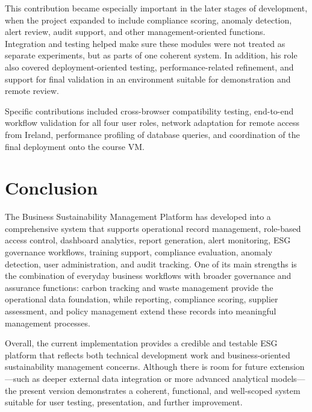 \documentclass[11pt,a4paper]{article}
\begin{document}
This contribution became especially important in the later stages of development, when the project expanded to include compliance scoring, anomaly detection, alert review, audit support, and other management-oriented functions. Integration and testing helped make sure these modules were not treated as separate experiments, but as parts of one coherent system. In addition, his role also covered deployment-oriented testing, performance-related refinement, and support for final validation in an environment suitable for demonstration and remote review.

Specific contributions included cross-browser compatibility testing, end-to-end workflow validation for all four user roles, network adaptation for remote access from Ireland, performance profiling of database queries, and coordination of the final deployment onto the course VM.

\section{Conclusion}
The Business Sustainability Management Platform has developed into a comprehensive system that supports operational record management, role-based access control, dashboard analytics, report generation, alert monitoring, ESG governance workflows, training support, compliance evaluation, anomaly detection, user administration, and audit tracking. One of its main strengths is the combination of everyday business workflows with broader governance and assurance functions: carbon tracking and waste management provide the operational data foundation, while reporting, compliance scoring, supplier assessment, and policy management extend these records into meaningful management processes.

Overall, the current implementation provides a credible and testable ESG platform that reflects both technical development work and business-oriented sustainability management concerns. Although there is room for future extension---such as deeper external data integration or more advanced analytical models---the present version demonstrates a coherent, functional, and well-scoped system suitable for user testing, presentation, and further improvement.
\end{document}
